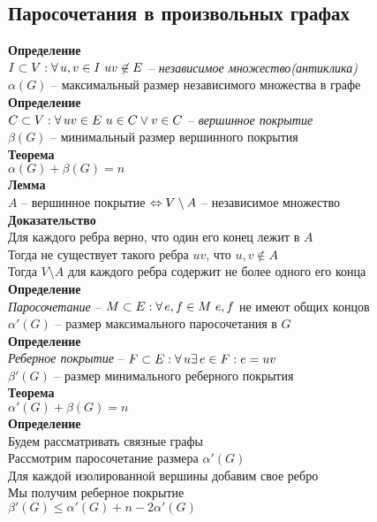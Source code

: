 \documentclass[12pt]{article}
\begin{document}
\subsection{Паросочетания в произвольных графах}
\textbf{Определение}\\
$I \subset V: \forall\, u,v \in I\ uv \not\in E$ -- \textit{независимое множество(антиклика)}\\
$\alpha(G)$ -- максимальный размер независимого множества в графе\\
\textbf{Определение}\\
$C \subset V: \forall\, uv \in E\ u\in C \lor v \in C$ -- \textit{вершинное покрытие}\\
$\beta(G)$ -- минимальный размер вершинного покрытия\\
\textbf{Теорема}\\
$\alpha(G) + \beta(G) = n$\\
\textbf{Лемма}\\
$A$ -- вершинное покрытие $\Leftrightarrow V \setminus A$ -- независимое множество\\
\textbf{Доказательство}\\
Для каждого ребра верно, что один его конец лежит в $A$\\
Тогда не существует такого ребра $uv$, что $u, v \not\in A$\\
Тогда $V \setminus A$ для каждого ребра содержит не более одного его конца\\
\textbf{Определение}\\
\textit{Паросочетание} -- $M \subset E: \forall\, e,f \in M\ e,f$ не имеют общих концов\\
$\alpha'(G)$ -- размер максимального паросочетания в $G$\\
\textbf{Определение}\\
\textit{Реберное покрытие} -- $F\subset E: \forall\, u \exists\, e\in F: e = uv$\\
$\beta'(G)$ -- размер минимального реберного покрытия\\
\textbf{Теорема}\\
$\alpha'(G)+\beta(G) = n$\\
\textbf{Определение}\\
Будем рассматривать связные графы\\
Рассмотрим паросочетание размера $\alpha'(G)$\\
Для каждой изолированной вершины добавим свое ребро\\
Мы получим реберное покрытие\\
$\beta'(G) \leq \alpha'(G)+n - 2\alpha'(G)$\\
\end{document}
